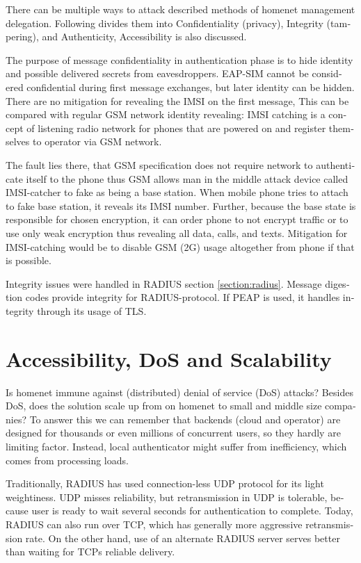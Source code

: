 \documentclass[12pt,a4paper,english]{tutthesis}
\begin{document}
\begin{otherlanguage}{english}
There can be multiple ways to attack described methods of
homenet management delegation. Following divides them into
Confidentiality (privacy), Integrity (tampering), and
Authenticity, Accessibility is also discussed.


The purpose of message confidentiality in authentication phase is
to hide identity and possible delivered secrets from
eavesdroppers. EAP-SIM cannot be considered confidential during 
first message exchanges, but later identity can be hidden.
There are no mitigation for revealing the IMSI on the first message,
This can be compared with regular GSM network identity revealing: IMSI
catching is a concept of listening radio network for phones that are
powered on and register themselves to operator via GSM network.  

The
fault lies there, that GSM specification does not require network to
authenticate itself to the phone thus GSM allows man in the middle
attack device called IMSI-catcher to fake as being a base station.
When mobile phone tries to attach to fake base station, it reveals its
IMSI number. Further, because the base state is responsible for chosen
encryption, it can order phone to not encrypt traffic or to use only
weak encryption thus revealing all data, calls, and
texts\cite{imsi-heise}. Mitigation for IMSI-catching would be to
disable GSM (2G) usage altogether from phone if that is possible.




Integrity issues were handled in RADIUS section \ref{section:radius}.
Message digestion codes provide integrity for RADIUS-protocol.
If PEAP is used, it handles integrity through its usage of TLS\cite{peap}.

\section{Accessibility, DoS and Scalability}
\label{sec-6-6}
Is homenet immune against (distributed) denial of service (DoS)
attacks? Besides DoS, does the solution scale up from on homenet to
small and middle size companies?
To answer this we can remember that backends (cloud and operator) are
designed for thousands or even millions of concurrent users, so 
they hardly are limiting factor. Instead, local
authenticator might suffer from inefficiency, which
comes from processing loads\cite{2009-lin-simefficiency}.


Traditionally, RADIUS has used connection-less UDP protocol for its
light weightiness. UDP misses reliability, but retransmission in UDP is
tolerable, because user is ready to wait several seconds for
authentication to complete. Today, RADIUS can also run over TCP, which
has generally more aggressive retransmission
rate\cite[2.2.1]{rfc5080}. On the other hand, use of an alternate
RADIUS server serves better than waiting for TCPs reliable delivery.




\end{otherlanguage}
\end{document}
